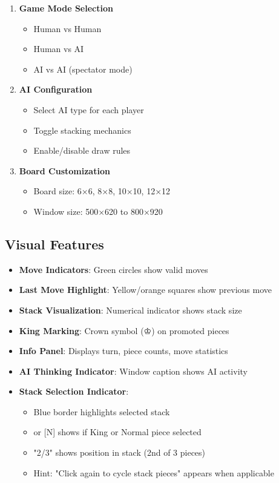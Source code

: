 \documentclass[12pt,a4paper]{article}
\begin{document}
\begin{enumerate}
    \item \textbf{Game Mode Selection}
    \begin{itemize}
        \item Human vs Human
        \item Human vs AI
        \item AI vs AI (spectator mode)
    \end{itemize}
    
    \item \textbf{AI Configuration}
    \begin{itemize}
        \item Select AI type for each player
        \item Toggle stacking mechanics
        \item Enable/disable draw rules
    \end{itemize}
    
    \item \textbf{Board Customization}
    \begin{itemize}
        \item Board size: 6×6, 8×8, 10×10, 12×12
        \item Window size: 500×620 to 800×920
    \end{itemize}
\end{enumerate}

\subsection{Visual Features}

\begin{itemize}
    \item \textbf{Move Indicators}: Green circles show valid moves
    \item \textbf{Last Move Highlight}: Yellow/orange squares show previous move
    \item \textbf{Stack Visualization}: Numerical indicator shows stack size
    \item \textbf{King Marking}: Crown symbol (♔) on promoted pieces
    \item \textbf{Info Panel}: Displays turn, piece counts, move statistics
    \item \textbf{AI Thinking Indicator}: Window caption shows AI activity
    \item \textbf{Stack Selection Indicator}: 
    \begin{itemize}
        \item Blue border highlights selected stack
        \item [K] or [N] shows if King or Normal piece selected
        \item "2/3" shows position in stack (2nd of 3 pieces)
        \item Hint: "Click again to cycle stack pieces" appears when applicable
    \end{itemize}
\end{itemize}
\end{document}
